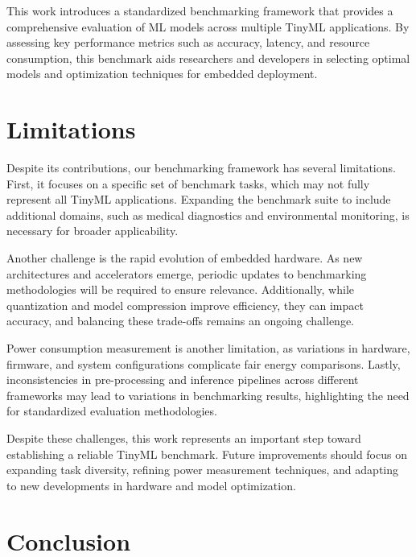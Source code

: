 \documentclass[conference]{IEEEtran}
\begin{document}
This work introduces a standardized benchmarking framework that provides a comprehensive evaluation of ML models across multiple TinyML applications. By assessing key performance metrics such as accuracy, latency, and resource consumption, this benchmark aids researchers and developers in selecting optimal models and optimization techniques for embedded deployment.


\section{Limitations}

Despite its contributions, our benchmarking framework has several limitations. First, it focuses on a specific set of benchmark tasks, which may not fully represent all TinyML applications. Expanding the benchmark suite to include additional domains, such as medical diagnostics and environmental monitoring, is necessary for broader applicability.

Another challenge is the rapid evolution of embedded hardware. As new architectures and accelerators emerge, periodic updates to benchmarking methodologies will be required to ensure relevance. Additionally, while quantization and model compression improve efficiency, they can impact accuracy, and balancing these trade-offs remains an ongoing challenge.

Power consumption measurement is another limitation, as variations in hardware, firmware, and system configurations complicate fair energy comparisons. Lastly, inconsistencies in pre-processing and inference pipelines across different frameworks may lead to variations in benchmarking results, highlighting the need for standardized evaluation methodologies.

Despite these challenges, this work represents an important step toward establishing a reliable TinyML benchmark. Future improvements should focus on expanding task diversity, refining power measurement techniques, and adapting to new developments in hardware and model optimization.


\section{Conclusion}
\end{document}
